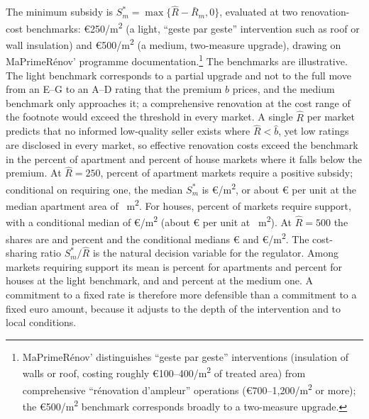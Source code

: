 \documentclass[10pt,letterpaper]{bp-template-concise}
\begin{document}
The minimum subsidy is $S^*_m=\max\{\hat R-\bar R_m,0\}$, evaluated at two renovation-cost benchmarks: \euro{}250/m\textsuperscript{2} (a light, ``geste par geste'' intervention such as roof or wall insulation) and \euro{}500/m\textsuperscript{2} (a medium, two-measure upgrade), drawing on MaPrimeR\'enov' programme documentation.\footnote{MaPrimeR\'enov' distinguishes ``geste par geste'' interventions (insulation of walls or roof, costing roughly \euro{}100--400/m\textsuperscript{2} of treated area) from comprehensive ``r\'enovation d'ampleur'' operations (\euro{}700--1{,}200/m\textsuperscript{2} or more); the \euro{}500/m\textsuperscript{2} benchmark corresponds broadly to a two-measure upgrade.} The benchmarks are illustrative. The light benchmark corresponds to a partial upgrade and not to the full move from an E--G to an A--D rating that the premium $b$ prices, and the medium benchmark only approaches it; a comprehensive renovation at the cost range of the footnote would exceed the threshold in every market. A single $\hat R$ per market predicts that no informed low-quality seller exists where $\hat R<\hat b$, yet low ratings are disclosed in every market, so effective renovation costs exceed the benchmark in the \attBaseNoSubsidyTwoFiftyApt{} percent of apartment and \attBaseNoSubsidyTwoFiftyHouse{} percent of house markets where it falls below the premium. At $\hat R=250$, \attScBaseShareTwoFiftyApt{} percent of apartment markets require a positive subsidy; conditional on requiring one, the median $S^*_m$ is \euro{}\attBaseSMedTwoFiftyApt{}/m\textsuperscript{2}, or about \euro{}\attBaseUnitTwoFiftyApt{} per unit at the median apartment area of \attBaseAreaMedApt{}~m\textsuperscript{2}. For houses, \attScBaseShareTwoFiftyHouse{} percent of markets require support, with a conditional median of \euro{}\attBaseSMedTwoFiftyHouse{}/m\textsuperscript{2} (about \euro{}\attBaseUnitTwoFiftyHouse{} per unit at \attBaseAreaMedHouse{}~m\textsuperscript{2}). At $\hat R=500$ the shares are \attScBaseShareFiveHundredApt{} and \attScBaseShareFiveHundredHouse{} percent and the conditional medians \euro{}\attBaseSMedFiveHundredApt{} and \euro{}\attBaseSMedFiveHundredHouse{}/m\textsuperscript{2}. The cost-sharing ratio $S^*_m/\hat R$ is the natural decision variable for the regulator. Among markets requiring support its mean is \attBaseCostShareTwoFiftyApt{} percent for apartments and \attBaseCostShareTwoFiftyHouse{} percent for houses at the light benchmark, and \attBaseCostShareFiveHundredApt{} and \attBaseCostShareFiveHundredHouse{} percent at the medium one. A commitment to a fixed rate is therefore more defensible than a commitment to a fixed euro amount, because it adjusts to the depth of the intervention and to local conditions.
\end{document}
